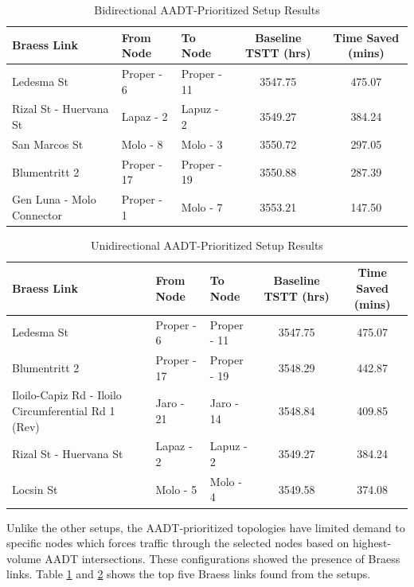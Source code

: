 \begin{table}[H]
    \centering
    \small 
    \setlength{\tabcolsep}{4pt} 
    \renewcommand{\thetable}{4.7}
    \begin{tabular}{|p{4.2cm}|l|l|c|c|}
    \hline
    \textbf{Braess Link} & \textbf{From Node} & \textbf{To Node} & \textbf{\parbox{2cm}{\centering Baseline TSTT (hrs)}} & \textbf{\parbox{2cm}{\centering Time Saved (mins)}} \\ \hline
    Ledesma St & Proper - 6 & Proper - 11 & 3547.75 & 475.07 \\ \hline
    Rizal St - Huervana St & Lapaz - 2 & Lapuz - 2 & 3549.27 & 384.24 \\ \hline
    San Marcos St & Molo - 8 & Molo - 3 & 3550.72 & 297.05 \\ \hline
    Blumentritt 2 & Proper - 17 & Proper - 19 & 3550.88 & 287.39 \\ \hline
    Gen Luna - Molo Connector & Proper - 1 & Molo - 7 & 3553.21 & 147.50 \\ \hline
    \end{tabular}
    \caption{Bidirectional AADT-Prioritized Setup Results}
    \label{tab:5.7}
\end{table}

\begin{table}[H]
    \centering
    \small
    \setlength{\tabcolsep}{4pt}
    \renewcommand{\thetable}{4.8}
    \begin{tabular}{|p{5.2cm}|l|l|c|c|}
    \hline
    \textbf{Braess Link} & \textbf{From Node} & \textbf{To Node} & \textbf{\parbox{2cm}{\centering Baseline TSTT (hrs)}} & \textbf{\parbox{2cm}{\centering Time Saved (mins)}} \\ \hline
    Ledesma St & Proper - 6 & Proper - 11 & 3547.75 & 475.07 \\ \hline
    Blumentritt 2 & Proper - 17 & Proper - 19 & 3548.29 & 442.87 \\ \hline
    Iloilo-Capiz Rd - Iloilo Circumferential Rd 1 (Rev) & Jaro - 21 & Jaro - 14 & 3548.84 & 409.85 \\ \hline
    Rizal St - Huervana St & Lapaz - 2 & Lapuz - 2 & 3549.27 & 384.24 \\ \hline
    Locsin St & Molo - 5 & Molo - 4 & 3549.58 & 374.08 \\ \hline
    \end{tabular}
    \caption{Unidirectional AADT-Prioritized Setup Results}
    \label{tab:5.8}
\end{table}

Unlike the other setups, the AADT-prioritized topologies have limited demand to specific nodes which forces traffic through the selected nodes based on highest-volume AADT intersections. These configurations showed the presence of Braess links. Table \ref{tab:5.7} and \ref{tab:5.8} shows the top five Braess links found from the setups.

